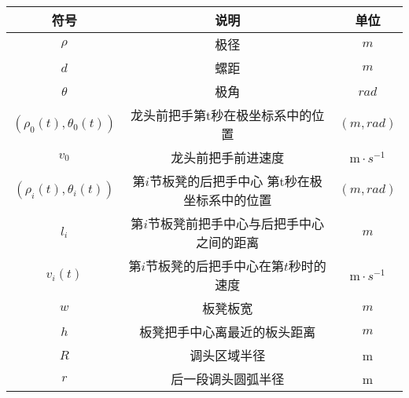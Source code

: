 \documentclass[../main.tex]{subfiles}
\begin{document}



\begin{table}[H]
    \centering
    \renewcommand{\arrayrulewidth}{2.0pt}
    \begin{tabular}{ccc}
   \hline
    符号 & 说明 & 单位  \\ 
    \hline
    $\rho$                 & 极径                     & $m$                      \\
    $d$                   & 螺距                      &   $m$                    \\
    $\theta $                    & 极角                     & $rad$                      \\
 \((\rho _0(t),\theta _0(t))\)       & 龙头前把手第t秒在极坐标系中的位置                   & $(m,rad) $                     \\
    \(v_0\)                      & 龙头前把手前进速度                     & $\mathrm{m}\cdot s^{-1} $              \\
\((\rho _{i}(t),\theta _{i}(t))\)                   & 第\(i\)节板凳的后把手中心 第t秒在极坐标系中的位置                     & $(m,rad) $                      \\
$l_i$             &   第$i$节板凳前把手中心与后把手中心之间的距离                   & $m$                      \\
  \(v_i(t)\)                     & 第\(i\)节板凳的后把手中心在第\(t\)秒时的速度                     &  $\mathrm{m}\cdot s^{-1} $                    \\
   $w$                      & 板凳板宽                     & $m$                      \\
    $h$                   & 板凳把手中心离最近的板头距离                     & $m$                       \\
  $R$                     & 调头区域半径                     & m                      \\
    $r$                      & 后一段调头圆弧半径                      & m                       \\
   \hline
    \end{tabular}
    \end{table}
\end{document}
